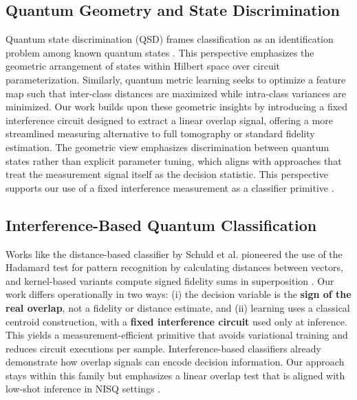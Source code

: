 \documentclass[conference]{IEEEtran}
\begin{document}
\subsection{Quantum Geometry and State Discrimination}
Quantum state discrimination (QSD) frames classification as an identification problem among known quantum states \cite{sergioli2019binary,gonzalez2021classification}. This perspective emphasizes the geometric arrangement of states within Hilbert space over circuit parameterization. Similarly, quantum metric learning seeks to optimize a feature map such that inter-class distances are maximized while intra-class variances are minimized. Our work builds upon these geometric insights by introducing a fixed interference circuit designed to extract a linear overlap signal, offering a more streamlined measuring alternative to full tomography or standard fidelity estimation.
The geometric view emphasizes discrimination between quantum states rather than explicit parameter tuning, which aligns with approaches that treat the measurement signal itself as the decision statistic. This perspective supports our use of a fixed interference measurement as a classifier primitive \cite{sergioli2019binary,gonzalez2021classification}.

\subsection{Interference-Based Quantum Classification}

Works like the distance-based classifier by Schuld et al. \cite{schuld2017distance,schuld2018book} pioneered the use of the Hadamard test for pattern recognition by calculating distances between vectors, and kernel-based variants compute signed fidelity sums in superposition \cite{blank2020kernel,blank2022compact}. Our work differs operationally in two ways: (i) the decision variable is the \textbf{sign of the real overlap}, not a fidelity or distance estimate, and (ii) learning uses a classical centroid construction, with a \textbf{fixed interference circuit} used only at inference. This yields a measurement-efficient primitive that avoids variational training and reduces circuit executions per sample.
Interference-based classifiers already demonstrate how overlap signals can encode decision information. Our approach stays within this family but emphasizes a linear overlap test that is aligned with low-shot inference in NISQ settings \cite{schuld2017distance,schuld2018book}.
\end{document}
